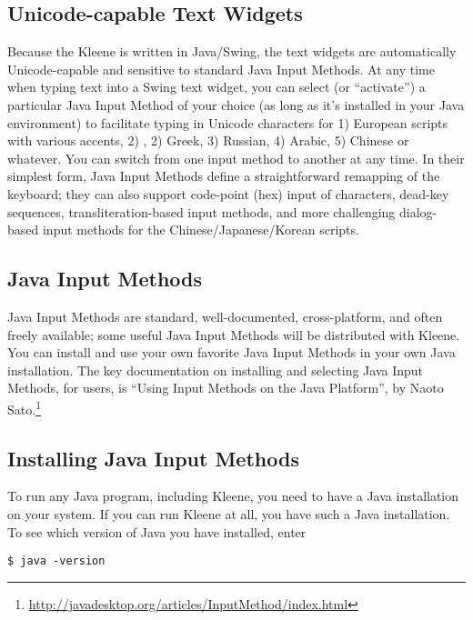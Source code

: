 \subsection{Unicode-capable Text Widgets}

Because the Kleene  is written in Java/Swing, the text widgets
are automatically Unicode-capable and sensitive to standard Java Input
Methods.  At any time when typing text into a Swing text widget, you can
select (or ``activate'') a particular Java Input Method of your choice
(as long as it's installed in your Java environment) to facilitate typing
in Unicode characters for 1) European scripts with various accents, 2)
, 2) Greek, 3) Russian, 4) Arabic, 5) Chinese or whatever.  You
can switch from one input method to another at any time.  In their
simplest form, Java Input Methods define a straightforward remapping of
the keyboard; they can also support code-point (hex) input of characters,
dead-key sequences, transliteration-based input methods, and more
challenging dialog-based input methods for the Chinese/Japanese/Korean
scripts.

\subsection{Java Input Methods}

Java Input Methods are standard, well-documented, cross-platform, and
often freely available; some useful Java Input Methods will be
distributed with Kleene.  You can install and use your own favorite Java
Input Methods in your own Java installation.  The key documentation on
installing and selecting Java Input Methods, for users, is ``Using Input
Methods on the Java Platform'', by Naoto
Sato.\footnote{\url{http://javadesktop.org/articles/InputMethod/index.html}}



\subsection{Installing Java Input Methods}

To run any Java program, including Kleene, you need to have a Java
installation on your system.  If you can run Kleene at all, you have such
a Java installation.  To see which version of Java you have installed,
enter

\begin{Verbatim}
$ java -version
\end{Verbatim}

